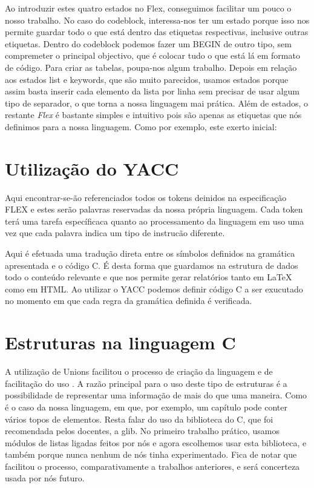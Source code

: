 \documentclass[12pt,letterpaper]{article}
\begin{document}
Ao introduzir estes quatro estados no Flex, conseguimos facilitar um pouco o nosso trabalho. No caso do codeblock, interessa-nos ter um estado porque isso nos permite guardar todo o que está dentro das etiquetas respectivas, inclusive outras etiquetas. Dentro do codeblock podemos fazer um BEGIN de outro tipo, sem compremeter o principal objectivo, que é colocar tudo o que está lá em formato de código. Para criar as tabelas, poupa-nos algum trabalho. Depois em relação aos estados list e keywords, que são muito parecidos, usamos estados porque assim basta inserir cada elemento da lista por linha sem precisar de usar algum tipo de separador, o que torna a nossa linguagem mai prática. Além de estados, o restante \textit{Flex} é bastante simples e intuitivo pois são apenas as etiquetas que nós definimos para a nossa linguagem. Como por exemplo, este exerto inicial:

\newpage
\section{Utilização do YACC}
Aqui encontrar-se-ão referenciados todos os tokens deinidos na especificação FLEX e estes serão palavras reservadas da nossa própria linguagem. Cada token terá uma tarefa específicaca quanto ao processamento da linguagem em uso uma vez que cada palavra indica um tipo de instrucão diferente.

Aqui é efetuada uma tradução direta entre os símbolos definidos na gramática apresentada e o código C. É desta forma que guardamos na estrutura de dados todo o conteúdo relevante e que nos permite gerar relatórios tanto em LaTeX como em HTML. Ao utilizar o YACC podemos definir código C a ser exucutado no momento em que cada regra da gramática definida é verificada. 

\newpage
\section{Estruturas na linguagem C}
A utilização de Unions facilitou o processo de criação da linguagem e de facilitação do uso . A razão principal para o uso deste tipo de estruturas é a possibilidade de representar uma informação de mais do que uma maneira. Como é o caso da nossa linguagem, em que, por exemplo, um capítulo pode conter vários topos de elementos. Resta falar do uso da biblioteca do C, que foi recomendada pelos docentes, a glib. No primeiro trabalho prático, usamos módulos de listas ligadas feitos por nós e agora escolhemos usar esta biblioteca, e também porque nunca nenhum de nós tinha experimentado. Fica de notar que facilitou o processo, comparativamente a trabalhos anteriores, e será concerteza usada por nós futuro.  
\end{document}
